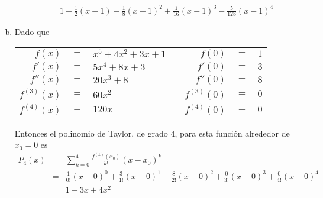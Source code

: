 \begin{solucion}
\begin{enumerate}[(a)]
\begin{eqnarray*}
   & = & 1 + \frac{1}{2}(x-1) - \frac{1}{8}(x-1)^2 + \frac{1}{16}(x-1)^3 - \frac{5}{128}(x-1)^4
  \end{eqnarray*}

  
  \item Dado que 
  \begin{center}
   \begin{tabular}{rclcrcl}
    $f(x)$ & $=$ & $x^5 + 4x^2 + 3x + 1$ & \hspace{2cm} & $f(0)$ & $=$ & $1$ \\
    $f'(x)$ & $=$ & $5x^4 + 8x + 3$ & & $f'(0)$ & $=$ & $3$ \\
    $f''(x)$ & $=$ & $20x^3 + 8$ & & $f''(0)$ & $=$ & $8$ \\
    $f^{(3)}(x)$ & $=$ & $60x^2$ & & $f^{(3)}(0)$ & $=$ & $0$ \\
    $f^{(4)}(x)$ & $=$ & $120x$ & & $f^{(4)}(0)$ & $=$ & $0$
   \end{tabular}
  \end{center}
  Entonces el polinomio de Taylor, de grado $4$, para esta funci\'on alrededor de $x_0 = 0$ es
  \begin{eqnarray*}
   P_4(x) & = & \sum_{k=0}^{4} \frac{f^{(k)}(x_0)}{k!}(x-x_0)^k \\
   & = & \frac{1}{0!}(x-0)^0 + \frac{3}{1!}(x-0)^1 + \frac{8}{2!}(x-0)^2 + \frac{0}{3!}(x-0)^3 + \frac{0}{4!}(x-0)^4 \\
   & = & 1 + 3x + 4x^2
  \end{eqnarray*}
  

\end{enumerate}
\end{solucion}

